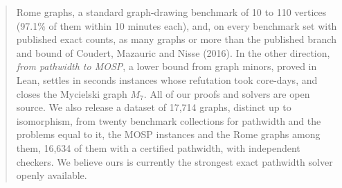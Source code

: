 \documentclass[11pt,letterpaper]{article}
\numberwithin{figure}{section}
\numberwithin{table}{section}
\theoremstyle{plain}
\theoremstyle{definition}
\theoremstyle{remark}
\begin{document}
\begin{abstract}
Rome graphs, a standard graph-drawing benchmark of 10 to 110 vertices (97.1\% of them within 10 minutes each), and, on every benchmark set with published
exact counts, as many graphs or more than the published branch and bound of
Coudert, Mazauric and Nisse (2016). In the other direction, \emph{from pathwidth to MOSP}, a lower bound from graph
minors, proved in Lean, settles in seconds instances whose refutation took
core-days, and closes the Mycielski graph $M_7$. All of our proofs and solvers are open source.
We also release a dataset of 17,714 graphs, distinct up to isomorphism, from
twenty benchmark collections for pathwidth and the problems equal to it, the
MOSP instances and the Rome graphs among them, 16,634 of them with a certified
pathwidth, with independent checkers. We believe ours is currently the
strongest exact pathwidth solver openly available.
\end{abstract}

\clearpage
\setcounter{tocdepth}{2}
{\small\tableofcontents}
\clearpage












\begin{appendices}
\clearpage
\clearpage
\clearpage
\clearpage
\clearpage
\end{appendices}
\end{document}
